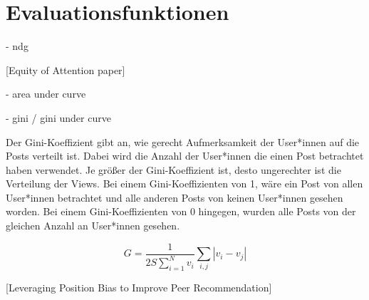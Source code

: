 \chapter{Evaluationsfunktionen}


- ndg

[Equity of Attention paper]

- area under curve

- gini / gini under curve

Der Gini-Koeffizient gibt an, wie gerecht Aufmerksamkeit der User*innen auf die Posts verteilt ist. Dabei wird die Anzahl der User*innen die einen Post betrachtet haben verwendet. Je größer der Gini-Koeffizient ist, desto ungerechter ist die Verteilung der Views. Bei einem Gini-Koeffizienten von 1, wäre ein Post von allen User*innen betrachtet und alle anderen Posts von keinen User*innen gesehen worden. Bei einem Gini-Koeffizienten von 0 hingegen, wurden alle Posts von der gleichen Anzahl an User*innen gesehen.

\begin{equation}
G = \frac{1}{2S\sum_{i = 1}^{N}v_{i}}\sum_{i,j}|v_{i} - v_{j} |
\end{equation}

[Leveraging Position Bias to Improve Peer
Recommendation]

\cite{Lerman2014} \cite{Salganik2006854}


